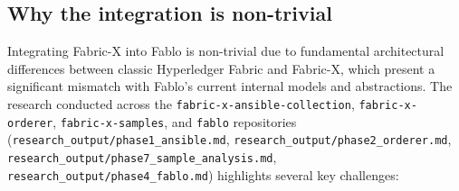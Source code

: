 \subsection{Why the integration is non-trivial}

Integrating Fabric-X into Fablo is non-trivial due to fundamental architectural differences between classic Hyperledger Fabric and Fabric-X, which present a significant mismatch with Fablo's current internal models and abstractions. The research conducted across the \texttt{fabric-x-ansible-collection}, \texttt{fabric-x-orderer}, \texttt{fabric-x-samples}, and \texttt{fablo} repositories (\texttt{research\_output/phase1\_ansible.md}, \texttt{research\_output/phase2\_orderer.md}, \texttt{research\_output/phase7\_sample\_analysis.md}, \texttt{research\_output/phase4\_fablo.md}) highlights several key challenges:
